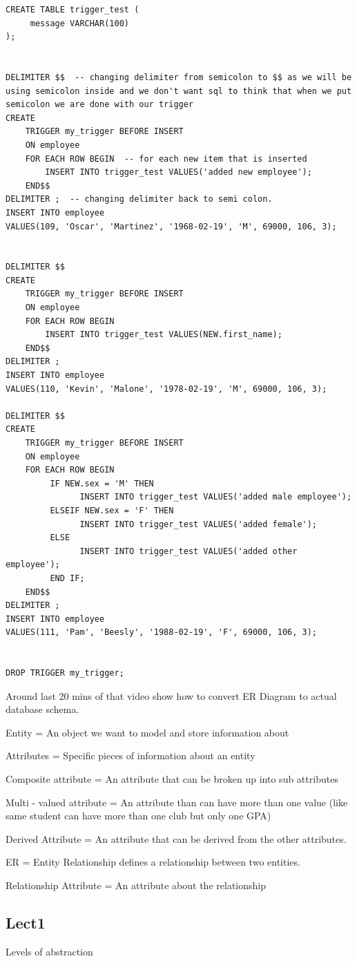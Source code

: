 \documentclass[8pt, a4paper, oneside, twocolumn]{extarticle}
\begin{document}
\begin{verbatim}
CREATE TABLE trigger_test (
     message VARCHAR(100)
);


DELIMITER $$  -- changing delimiter from semicolon to $$ as we will be using semicolon inside and we don't want sql to think that when we put semicolon we are done with our trigger
CREATE
    TRIGGER my_trigger BEFORE INSERT
    ON employee
    FOR EACH ROW BEGIN  -- for each new item that is inserted
        INSERT INTO trigger_test VALUES('added new employee');
    END$$
DELIMITER ;  -- changing delimiter back to semi colon.
INSERT INTO employee
VALUES(109, 'Oscar', 'Martinez', '1968-02-19', 'M', 69000, 106, 3);


DELIMITER $$
CREATE
    TRIGGER my_trigger BEFORE INSERT
    ON employee
    FOR EACH ROW BEGIN
        INSERT INTO trigger_test VALUES(NEW.first_name);
    END$$
DELIMITER ;
INSERT INTO employee
VALUES(110, 'Kevin', 'Malone', '1978-02-19', 'M', 69000, 106, 3);

DELIMITER $$
CREATE
    TRIGGER my_trigger BEFORE INSERT
    ON employee
    FOR EACH ROW BEGIN 
         IF NEW.sex = 'M' THEN
               INSERT INTO trigger_test VALUES('added male employee');
         ELSEIF NEW.sex = 'F' THEN
               INSERT INTO trigger_test VALUES('added female');
         ELSE
               INSERT INTO trigger_test VALUES('added other employee');
         END IF;
    END$$
DELIMITER ;
INSERT INTO employee
VALUES(111, 'Pam', 'Beesly', '1988-02-19', 'F', 69000, 106, 3);


DROP TRIGGER my_trigger;
\end{verbatim}
Around last 20 mins of that video show how to convert ER Diagram to actual database schema.

Entity = An object we want to model and store information about

Attributes = Specific pieces of information about an entity

Composite attribute = An attribute that can be broken up into sub attributes

Multi - valued attribute = An attribute than can have more than one value (like same student can have more than one club but only one GPA)

Derived Attribute = An attribute that can be derived from the other attributes.

ER = Entity Relationship defines a relationship between two entities.

Relationship Attribute = An attribute about the relationship

\subsection{Lect1}
Levels of abstraction
\end{document}
